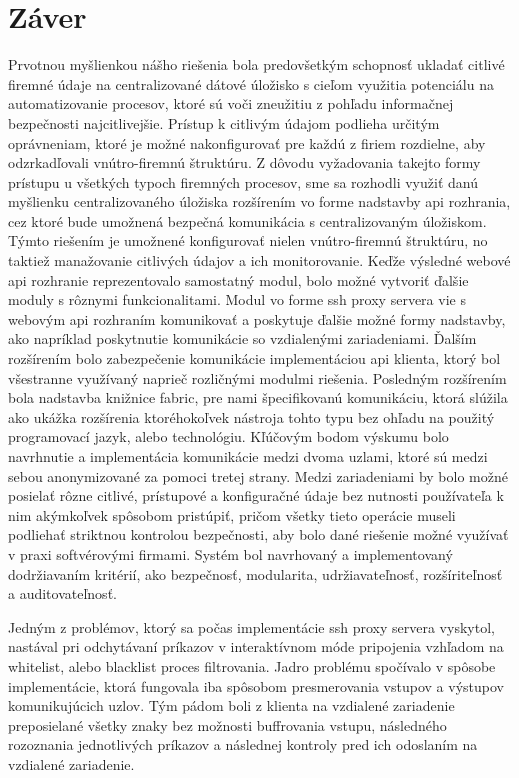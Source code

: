 \chapter{Záver}\label{ch:zaver}

Prvotnou myšlienkou nášho riešenia bola predovšetkým schopnosť ukladať citlivé firemné údaje na centralizované dátové úložisko
s cieľom využitia potenciálu na automatizovanie procesov, ktoré sú voči zneužitiu z pohľadu informačnej bezpečnosti
najcitlivejšie.
Prístup k citlivým údajom podlieha určitým oprávneniam, ktoré je možné nakonfigurovať pre každú z firiem rozdielne, aby
odzrkadľovali vnútro-firemnú štruktúru.
Z dôvodu vyžadovania takejto formy prístupu u všetkých typoch firemných procesov, sme sa rozhodli využiť danú myšlienku
centralizovaného úložiska rozšírením vo forme nadstavby api rozhrania, cez ktoré bude umožnená bezpečná komunikácia s centralizovaným
úložiskom.
Týmto riešením je umožnené konfigurovať nielen vnútro-firemnú štruktúru, no taktiež manažovanie citlivých údajov a ich monitorovanie.
Keďže výsledné webové api rozhranie reprezentovalo samostatný modul, bolo možné vytvoriť ďalšie moduly s rôznymi funkcionalitami.
Modul vo forme ssh proxy servera vie s webovým api rozhraním komunikovať a poskytuje ďalšie možné formy nadstavby,
ako napríklad poskytnutie komunikácie so vzdialenými zariadeniami.
Ďalším rozšírením bolo zabezpečenie komunikácie implementáciou api klienta, ktorý bol všestranne využívaný naprieč rozličnými
modulmi riešenia.
Posledným rozšírením bola nadstavba knižnice fabric, pre nami špecifikovanú komunikáciu, ktorá slúžila ako ukážka rozšírenia
ktoréhokoľvek nástroja tohto typu bez ohľadu na použitý programovací jazyk, alebo technológiu.
Kľúčovým bodom výskumu bolo navrhnutie a implementácia komunikácie medzi dvoma uzlami, ktoré sú medzi sebou anonymizované za
pomoci tretej strany.
Medzi zariadeniami by bolo možné posielať rôzne citlivé, prístupové a konfiguračné údaje bez nutnosti používateľa k nim
akýmkoľvek spôsobom pristúpiť, pričom všetky tieto operácie museli podliehať striktnou kontrolou bezpečnosti, aby bolo
dané riešenie možné využívať v praxi softvérovými firmami.
Systém bol navrhovaný a implementovaný dodržiavaním kritérií, ako bezpečnosť, modularita, udržiavateľnosť, rozšíriteľnosť
a auditovateľnosť.

Jedným z problémov, ktorý sa počas implementácie ssh proxy servera vyskytol, nastával pri odchytávaní príkazov v interaktívnom
móde pripojenia vzhľadom na whitelist, alebo blacklist proces filtrovania.
Jadro problému spočívalo v spôsobe implementácie, ktorá fungovala iba spôsobom presmerovania vstupov a výstupov komunikujúcich
uzlov.
Tým pádom boli z klienta na vzdialené zariadenie preposielané všetky znaky bez možnosti buffrovania vstupu, následného
rozoznania jednotlivých príkazov a následnej kontroly pred ich odoslaním na vzdialené zariadenie.

